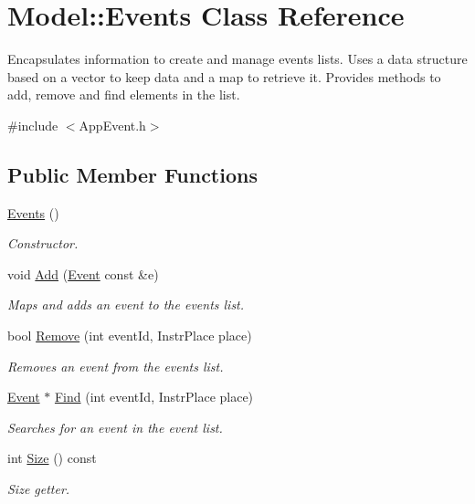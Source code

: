 \hypertarget{class_model_1_1_events}{\section{Model\-:\-:Events Class Reference}
\label{class_model_1_1_events}
}


Encapsulates information to create and manage events lists. Uses a data structure based on a vector to keep data and a map to retrieve it. Provides methods to add, remove and find elements in the list.  




{\ttfamily \#include $<$App\-Event.\-h$>$}

\subsection*{Public Member Functions}
\begin{DoxyCompactItemize}
\item 
\hypertarget{class_model_1_1_events_a821b31ddcebae7ffb66fc02b5e802e57}{\hyperlink{class_model_1_1_events_a821b31ddcebae7ffb66fc02b5e802e57}{Events} ()}\label{class_model_1_1_events_a821b31ddcebae7ffb66fc02b5e802e57}

\begin{DoxyCompactList}\small\item\em Constructor. \end{DoxyCompactList}\item 
void \hyperlink{class_model_1_1_events_af86366e9d7e4cc08d2b0fcca120c0728}{Add} (\hyperlink{class_model_1_1_event}{Event} const \&e)
\begin{DoxyCompactList}\small\item\em Maps and adds an event to the events list. \end{DoxyCompactList}\item 
bool \hyperlink{class_model_1_1_events_a404efb2e611382efe37327198cde55ba}{Remove} (int event\-Id, Instr\-Place place)
\begin{DoxyCompactList}\small\item\em Removes an event from the events list. \end{DoxyCompactList}\item 
\hyperlink{class_model_1_1_event}{Event} $\ast$ \hyperlink{class_model_1_1_events_acd039067632868b806a6804c12804a15}{Find} (int event\-Id, Instr\-Place place)
\begin{DoxyCompactList}\small\item\em Searches for an event in the event list. \end{DoxyCompactList}\item 
int \hyperlink{class_model_1_1_events_a8bd6124811e97bed5aee844c00e64244}{Size} () const 
\begin{DoxyCompactList}\small\item\em Size getter. \end{DoxyCompactList}\end{DoxyCompactItemize}


